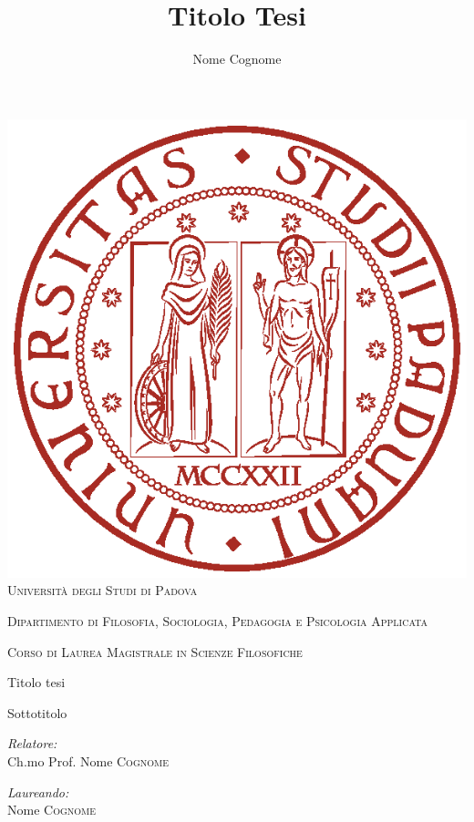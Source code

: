\documentclass[12pt,a4paper,twoside,openright]{book}
\title{Titolo Tesi}
\author{Nome Cognome}
\date{}
\begin{document}
\begin{titlepage}
 
\begin{center}
 
\includegraphics[scale=.45]{logoRed}
\\
\vspace{1cm}
\textsc{\LARGE Università degli Studi di Padova}

\vspace{1.5cm}
 
\textsc{\Large Dipartimento di Filosofia, Sociologia, Pedagogia e Psicologia Applicata}

\vspace{1.5cm} 


\textsc{\Large Corso di Laurea Magistrale in Scienze Filosofiche}\hspace{0.8cm}
  
\vspace{0.8cm}

\Huge \doublespacing \bfseries \begin{spacing}{1}{Titolo tesi}\end{spacing}
\hfill
\Large \bfseries \begin{spacing}{1}{Sottotitolo}\end{spacing}
\hfill
\vspace{0.5cm}
\begin{flushleft} \large
\emph{Relatore:} \\
Ch.mo Prof. Nome \textsc{Cognome}
\end{flushleft}
\vfill
\begin{flushright} \large
\emph{Laureando:}\\
Nome \textsc{Cognome}


\end{flushright}
\end{center}
\end{titlepage}
\end{document}
